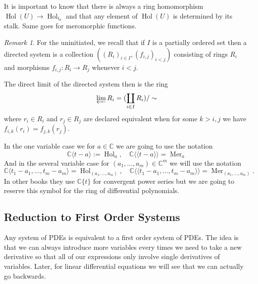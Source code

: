 \documentclass[12pt]{book}
\numberwithin{equation}{section}
\theoremstyle{definition}
\theoremstyle{remark}
\newtheorem{remark}[theorem]{Remark}
\newcommand{\CC}{\mathbb{C}}
\newcommand{\hol}{\operatorname{Hol}}
\newcommand{\Mer}{\operatorname{Mer}}
\newcommand{\llangle}{\langle \langle}
\newcommand{\rrangle}{\rangle \rangle}
\begin{document}
It is important to know that there is always a ring homomorphism $\hol(U) \to \hol_{t_0}$ and that any element of $\hol(U)$ is determined by its stalk. 
Same goes for meromorphic functions.

\begin{remark}
	For the uninitiated, we recall that if $I$ is a partially ordered set then a directed system is a collection $((R_i)_{i\in I},(f_{i,j})_{i<j})$ consisting of rings $R_i$ and morphisms $f_{i,j}:R_i \to R_j$ whenever $i<j$. 
	
	The direct limit of the directed system then is the ring 
	 $$ \varprojlim R_i = (\coprod_{i\in I} R_i)/\sim $$
	where $r_i \in R_i$ and $r_j \in R_j$ are declared equivalent when for some $k>i,j$ we have $f_{i,k}(r_i)  = f_{j,k}(r_j)$.
\end{remark}

In the one variable case we for $a\in \CC$ we are going to use the notation 
 $$ \CC\langle t-a \rangle := \hol_a, \quad \CC\llangle t-a \rrangle = \Mer_a $$
And in the several variable case for $(a_1,\ldots,a_m) \in \CC^m$ we will use the notation
 $$ \CC\langle t_1 -a_1,\ldots, t_m - a_m\rangle = \hol_{(a_1,\ldots,a_m)}, \quad \CC\llangle t_1-a_1,\ldots, t_m-a_m \rrangle = \Mer_{(a_1,\ldots,a_m)}.$$
 In other books they use $\CC\lbrace t \rbrace$ for convergent power series but we are going to reserve this symbol for the ring of differential polynomials.

\subsection{Reduction to First Order Systems}

Any system of PDEs is equivalent to a first order system of PDEs.
The idea is that we can always introduce more variables every times we need to take a new derivative so that all of our expressions only involve single derivatives of variables. 
Later, for linear differential equations we will see that we can actually go backwards. 
\end{document}
